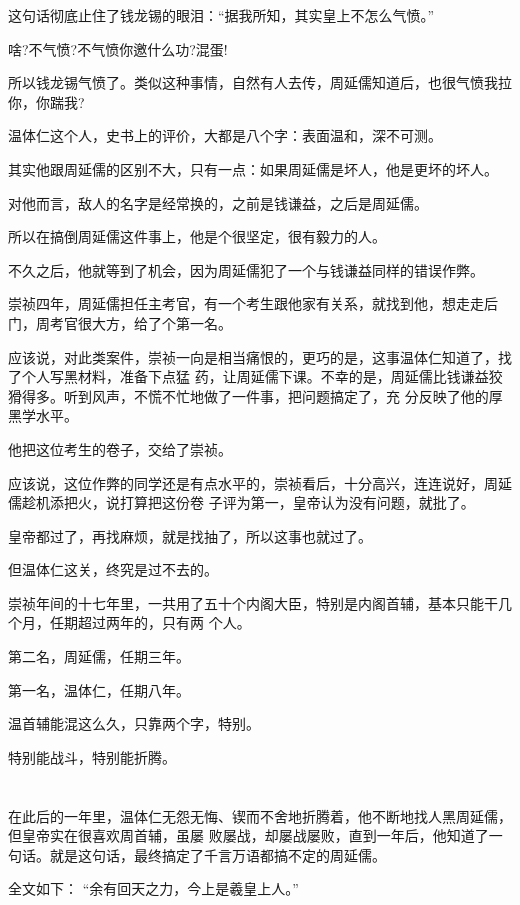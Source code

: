 \documentclass[11pt,a4paper,onecolumn]{article}
\begin{document}
这句话彻底止住了钱龙锡的眼泪：``据我所知，其实皇上不怎么气愤。''

啥?不气愤?不气愤你邀什么功?混蛋!

所以钱龙锡气愤了。类似这种事情，自然有人去传，周延儒知道后，也很气愤\myrule 我拉你，你踹我?

温体仁这个人，史书上的评价，大都是八个字：表面温和，深不可测。

其实他跟周延儒的区别不大，只有一点：如果周延儒是坏人，他是更坏的坏人。

对他而言，敌人的名字是经常换的，之前是钱谦益，之后是周延儒。

所以在搞倒周延儒这件事上，他是个很坚定，很有毅力的人。

不久之后，他就等到了机会，因为周延儒犯了一个与钱谦益同样的错误\myrule 作弊。

崇祯四年，周延儒担任主考官，有一个考生跟他家有关系，就找到他，想走走后门，周考官很大方，给了个第一名。

应该说，对此类案件，崇祯一向是相当痛恨的，更巧的是，这事温体仁知道了，找了个人写黑材料，准备下点猛
药，让周延儒下课。不幸的是，周延儒比钱谦益狡猾得多。听到风声，不慌不忙地做了一件事，把问题搞定了，充
分反映了他的厚黑学水平。

他把这位考生的卷子，交给了崇祯。

应该说，这位作弊的同学还是有点水平的，崇祯看后，十分高兴，连连说好，周延儒趁机添把火，说打算把这份卷
子评为第一，皇帝认为没有问题，就批了。

皇帝都过了，再找麻烦，就是找抽了，所以这事也就过了。

但温体仁这关，终究是过不去的。

崇祯年间的十七年里，一共用了五十个内阁大臣，特别是内阁首辅，基本只能干几个月，任期超过两年的，只有两
个人。

第二名，周延儒，任期三年。

第一名，温体仁，任期八年。

温首辅能混这么久，只靠两个字，特别。

特别能战斗，特别能折腾。

\section[\thesection]{}

在此后的一年里，温体仁无怨无悔、锲而不舍地折腾着，他不断地找人黑周延儒，但皇帝实在很喜欢周首辅，虽屡
败屡战，却屡战屡败，直到一年后，他知道了一句话。就是这句话，最终搞定了千言万语都搞不定的周延儒。

全文如下： ``余有回天之力，今上是羲皇上人。''
\end{document}
